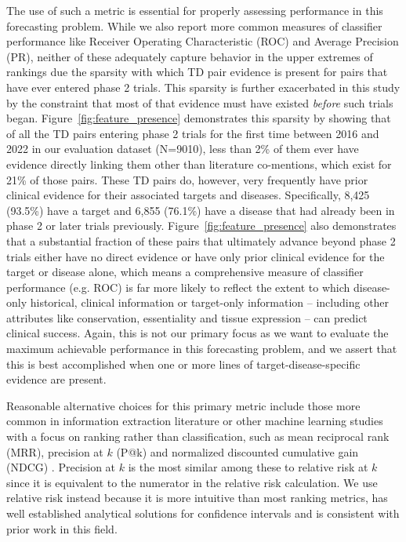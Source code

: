 \documentclass{article}
\begin{document}
The use of such a metric is essential for properly assessing performance in this forecasting problem. While we also report more common measures of classifier performance like Receiver Operating Characteristic (ROC) and Average Precision (PR), neither of these adequately capture behavior in the upper extremes of rankings due the sparsity with which TD pair evidence is present for pairs that have ever entered phase 2 trials. This sparsity is further exacerbated in this study by the constraint that most of that evidence must have existed \textit{before} such trials began. Figure~\ref{fig:feature_presence} demonstrates this sparsity by showing that of all the TD pairs entering phase 2 trials for the first time between 2016 and 2022 in our evaluation dataset (N=9010), less than 2\% of them ever have evidence directly linking them other than literature co-mentions, which exist for 21\% of those pairs. These TD pairs do, however, very frequently have prior clinical evidence for their associated targets and diseases. Specifically, 8,425 (93.5\%) have a target and 6,855 (76.1\%) have a disease that had already been in phase 2 or later trials previously. Figure~\ref{fig:feature_presence} also demonstrates that a substantial fraction of these pairs that ultimately advance beyond phase 2 trials either have no direct evidence or have only prior clinical evidence for the target or disease alone, which means a comprehensive measure of classifier performance (e.g. ROC) is far more likely to reflect the extent to which disease-only historical, clinical information or target-only information -- including other attributes like conservation, essentiality and tissue expression -- can predict clinical success. Again, this is not our primary focus as we want to evaluate the maximum achievable performance in this forecasting problem, and we assert that this is best accomplished when one or more lines of target-disease-specific evidence are present.

Reasonable alternative choices for this primary metric include those more common in information extraction literature or other machine learning studies with a focus on ranking rather than classification, such as mean reciprocal rank (MRR), precision at $k$ (P@k) and normalized discounted cumulative gain (NDCG) \cite{hoyt2022unified,moffat2022batch}. Precision at $k$ is the most similar among these to relative risk at $k$ since it is equivalent to the numerator in the relative risk calculation. We use relative risk instead because it is more intuitive than most ranking metrics, has well established analytical solutions for confidence intervals \cite{Katz1978-mo} and is consistent with prior work in this field.
\end{document}
